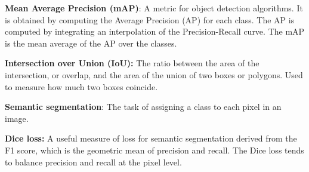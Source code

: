 \textbf{Mean Average Precision (mAP)}: A metric for object detection algorithms. It is obtained by computing the Average Precision (AP) for each class. The AP is computed by integrating an interpolation of the Precision-Recall curve. The mAP is the mean average of the AP over the classes.

\textbf{Intersection over Union (IoU):} The ratio between the area of the intersection, or overlap, and the area of the union of two boxes or polygons. Used to measure how much two boxes coincide.

\textbf{Semantic segmentation}: The task of assigning a class to each pixel in an image.

\textbf{Dice loss:} A useful measure of loss for semantic segmentation derived from the F1 score, which is the geometric mean of precision and recall. The Dice loss tends to balance precision and recall at the pixel level.
